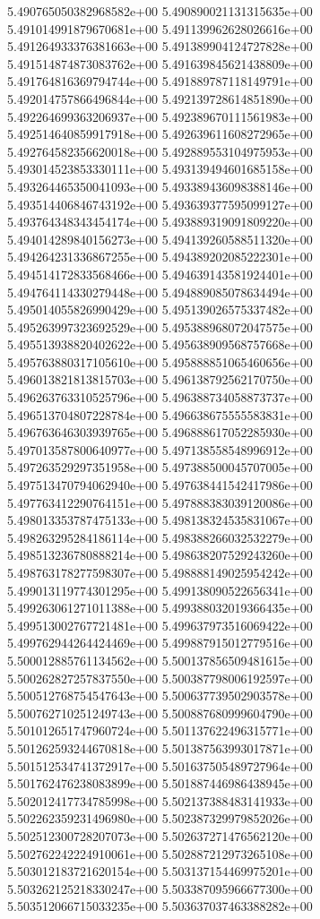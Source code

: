 5.490765050382968582e+00
5.490890021131315635e+00
5.491014991879670681e+00
5.491139962628026616e+00
5.491264933376381663e+00
5.491389904124727828e+00
5.491514874873083762e+00
5.491639845621438809e+00
5.491764816369794744e+00
5.491889787118149791e+00
5.492014757866496844e+00
5.492139728614851890e+00
5.492264699363206937e+00
5.492389670111561983e+00
5.492514640859917918e+00
5.492639611608272965e+00
5.492764582356620018e+00
5.492889553104975953e+00
5.493014523853330111e+00
5.493139494601685158e+00
5.493264465350041093e+00
5.493389436098388146e+00
5.493514406846743192e+00
5.493639377595099127e+00
5.493764348343454174e+00
5.493889319091809220e+00
5.494014289840156273e+00
5.494139260588511320e+00
5.494264231336867255e+00
5.494389202085222301e+00
5.494514172833568466e+00
5.494639143581924401e+00
5.494764114330279448e+00
5.494889085078634494e+00
5.495014055826990429e+00
5.495139026575337482e+00
5.495263997323692529e+00
5.495388968072047575e+00
5.495513938820402622e+00
5.495638909568757668e+00
5.495763880317105610e+00
5.495888851065460656e+00
5.496013821813815703e+00
5.496138792562170750e+00
5.496263763310525796e+00
5.496388734058873737e+00
5.496513704807228784e+00
5.496638675555583831e+00
5.496763646303939765e+00
5.496888617052285930e+00
5.497013587800640977e+00
5.497138558548996912e+00
5.497263529297351958e+00
5.497388500045707005e+00
5.497513470794062940e+00
5.497638441542417986e+00
5.497763412290764151e+00
5.497888383039120086e+00
5.498013353787475133e+00
5.498138324535831067e+00
5.498263295284186114e+00
5.498388266032532279e+00
5.498513236780888214e+00
5.498638207529243260e+00
5.498763178277598307e+00
5.498888149025954242e+00
5.499013119774301295e+00
5.499138090522656341e+00
5.499263061271011388e+00
5.499388032019366435e+00
5.499513002767721481e+00
5.499637973516069422e+00
5.499762944264424469e+00
5.499887915012779516e+00
5.500012885761134562e+00
5.500137856509481615e+00
5.500262827257837550e+00
5.500387798006192597e+00
5.500512768754547643e+00
5.500637739502903578e+00
5.500762710251249743e+00
5.500887680999604790e+00
5.501012651747960724e+00
5.501137622496315771e+00
5.501262593244670818e+00
5.501387563993017871e+00
5.501512534741372917e+00
5.501637505489727964e+00
5.501762476238083899e+00
5.501887446986438945e+00
5.502012417734785998e+00
5.502137388483141933e+00
5.502262359231496980e+00
5.502387329979852026e+00
5.502512300728207073e+00
5.502637271476562120e+00
5.502762242224910061e+00
5.502887212973265108e+00
5.503012183721620154e+00
5.503137154469975201e+00
5.503262125218330247e+00
5.503387095966677300e+00
5.503512066715033235e+00
5.503637037463388282e+00
